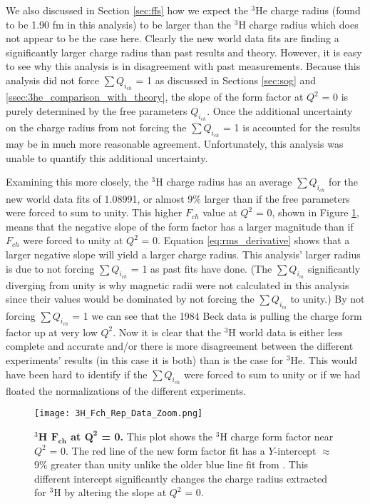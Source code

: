 We also discussed in Section \ref{sec:ffs} how we expect the $^3$He charge radius (found to be 1.90 fm in this analysis) to be larger than the $^3$H charge radius which does not appear to be the case here. Clearly the new world data fits are finding a significantly larger charge radius than past results and theory. However, it is easy to see why this analysis is in disagreement with past measurements. Because this analysis did not force $\sum Q_{i_{ch}}$ = 1 as discussed in Sections \ref{sec:sog} and \ref{ssec:3he_comparison_with_theory}, the slope of the form factor at $Q^2$ = 0 is purely determined by the free parameters $Q_{i_{ch}}$. Once the additional uncertainty on the charge radius from not forcing the $\sum Q_{i_{ch}}$ = 1 is accounted for the results may be in much more reasonable agreement. Unfortunately, this analysis was unable to quantify this additional uncertainty.

Examining this more closely, the $^3$H charge radius has an average $\sum Q_{i_{ch}}$ for the new world data fits of 1.08991, or almost 9$\%$ larger than if the free parameters were forced to sum to unity. This higher $F_{ch}$ value at $Q^2$ = 0, shown in Figure \ref{fig:3h_fch_zoom}, means that the negative slope of the form factor has a larger magnitude than if $F_{ch}$ were forced to unity at $Q^2$ = 0. Equation \ref{eq:rms_derivative} shows that a larger negative slope will yield a larger charge radius. This analysis' larger radius is due to not forcing $\sum Q_{i_{ch}}$ = 1 as past fits have done. (The $\sum Q_{i_m}$ significantly diverging from unity is why magnetic radii were not calculated in this analysis since their values would be dominated by not forcing the $\sum Q_{i_{m}}$ to unity.) By not forcing $\sum Q_{i_{ch}}$ = 1 we can see that the 1984 Beck data \cite{Article:Beck84} is pulling the charge form factor up at very low $Q^2$. Now it is clear that the $^3$H world data is either less complete and accurate and/or there is more disagreement between the different experiments' results (in this case it is both) than is the case for $^3$He. This would have been hard to identify if the $\sum Q_{i_{ch}}$ were forced to sum to unity or if we had floated the normalizations of the different experiments.

\begin{figure}[!ht]
	\begin{center}
	\texttt{[image: 3H\_Fch\_Rep\_Data\_Zoom.png]}
	\end{center}
	\caption[$^3$H $F_{ch}$ at $Q^2$ = 0]{
	{\bf{$^3$H $\boldsymbol{F_{ch}}$ at $\boldsymbol{Q^2}$ = 0.}} This plot shows the $^3$H charge form factor near $Q^2$ = 0. The red line of the new form factor fit has a $Y$-intercept $\approx$ 9$\%$ greater than unity unlike the older blue line fit from \cite{Article:Amroun}. This different intercept significantly changes the charge radius extracted for $^3$H by altering the slope at $Q^2$ = 0.}
	\label{fig:3h_fch_zoom}
\end{figure}

